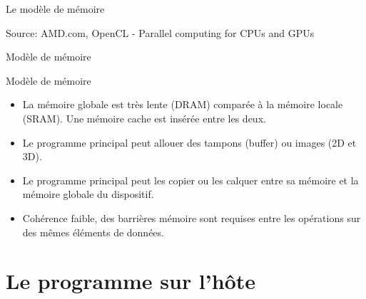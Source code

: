 \documentclass[10pt]{beamer}
\begin{document}
\begin{frame}[fragile]{Le modèle de mémoire}

  \begin{center}
  \end{center}
Source: AMD.com, OpenCL - Parallel computing for CPUs and GPUs
\end{frame}

\begin{frame}[fragile]{Modèle de mémoire}

  \begin{center}
  \end{center}
\end{frame}

\begin{frame}{Modèle de mémoire}
  \begin{itemize}
    \item La mémoire globale est très lente (DRAM) comparée à la mémoire locale (SRAM). Une mémoire cache est insérée entre les deux.

    \item Le programme principal peut allouer des tampons (buffer) ou images (2D et 3D).

    \item Le programme principal peut les copier ou les calquer entre sa mémoire et la mémoire globale du dispositif.

    \item Cohérence faible, des barrières mémoire sont requises entre les opérations sur des mêmes éléments de données.
  \end{itemize}
\end{frame}

\section{Le programme sur l'hôte}
\end{document}
